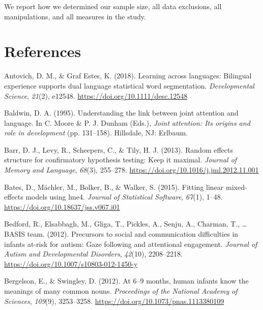 \documentclass[
  english,
  ,man,floatsintext]{apa6}
\begin{document}
We report how we determined our sample size, all data exclusions, all manipulations, and all measures in the study.

\newpage

\hypertarget{references}{%
\section{References}\label{references}}

\begingroup
\setlength{\parindent}{-0.5in}
\setlength{\leftskip}{0.5in}

\hypertarget{refs}{}
\leavevmode\hypertarget{ref-Antovich_GrafEstes_2017}{}%
Antovich, D. M., \& Graf Estes, K. (2018). Learning across languages: Bilingual experience supports dual language statistical word segmentation. \emph{Developmental Science}, \emph{21}(2), e12548. \url{https://doi.org/10.1111/desc.12548}

\leavevmode\hypertarget{ref-Baldwin_1995}{}%
Baldwin, D. A. (1995). Understanding the link between joint attention and language. In C. Moore \& P. J. Dunham (Eds.), \emph{Joint attention: Its origins and role in development} (pp. 131--158). Hillsdale, NJ: Erlbaum.

\leavevmode\hypertarget{ref-Barr_etal_2013}{}%
Barr, D. J., Levy, R., Scheepers, C., \& Tily, H. J. (2013). Random effects structure for confirmatory hypothesis testing: Keep it maximal. \emph{Journal of Memory and Language}, \emph{68}(3), 255--278. \url{https://doi.org/10.1016/j.jml.2012.11.001}

\leavevmode\hypertarget{ref-Bates_etal_2015}{}%
Bates, D., Mächler, M., Bolker, B., \& Walker, S. (2015). Fitting linear mixed-effects models using lme4. \emph{Journal of Statistical Software}, \emph{67}(1), 1--48. \url{https://doi.org/10.18637/jss.v067.i01}

\leavevmode\hypertarget{ref-Bedford_etal_2012}{}%
Bedford, R., Elsabbagh, M., Gliga, T., Pickles, A., Senju, A., Charman, T., \ldots{} BASIS team. (2012). Precursors to social and communication difficulties in infants at-risk for autism: Gaze following and attentional engagement. \emph{Journal of Autism and Developmental Disorders}, \emph{42}(10), 2208--2218. \url{https://doi.org/10.1007/s10803-012-1450-y}

\leavevmode\hypertarget{ref-Bergelson_Swingley_2012}{}%
Bergelson, E., \& Swingley, D. (2012). At 6--9 months, human infants know the meanings of many common nouns. \emph{Proceedings of the National Academy of Sciences}, \emph{109}(9), 3253--3258. \url{https://doi.org/10.1073/pnas.1113380109}
\end{document}
